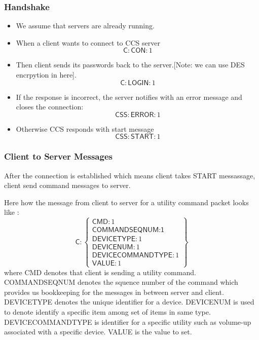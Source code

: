 \subsubsection{Handshake}
\label{sec:pdus:pdu:hs}
\begin{itemize}
\item We assume that servers are already running. 
\item When a client wants to connect to \textsf{CCS} server
  \[ \textsf{C} : \textsf{CON} : 1\]
\item Then client sends its passwords back to the server.[Note: we can use DES encrpytion in here]. 
  \[\textsf{C} : \textsf{LOGIN} : 1\]
\item If the response is incorrect, the server notifies with an error message and closes the connection:
  \[\textsf{CSS}:\textsf{ERROR}:1\]
\item Otherwise \textsf{CCS} responds with start message
  \[\textsf{CSS} : \textsf{START} : 1\]
\end{itemize}

\subsubsection{Client to Server Messages}
\label{sec:pdus:pdu:c_to_s}

After the connection is established which means client takes \textsf{START} messassage, client send command messages to server. 

Here how the message from client to server for a utility command packet looks like :
\[
\textsf{C}:\left\{ \begin{array}{ll}  \textsf{CMD}:1\\
                                      \textsf{COMMANDSEQNUM:1}\\
                                      \textsf{DEVICETYPE}:1 \\
                                       \textsf{DEVICENUM}:1 \\
                                      \textsf{DEVICECOMMANDTYPE}:1 \\
                                        \textsf{VALUE}:1

           \end{array} \right\}
\]                                        
where \textsf{CMD} denotes that client is sending a utility command. \textsf{COMMANDSEQNUM} denotes the squence number of the command which provides us bookkeeping for the messages in between server and client. \textsf{DEVICETYPE} denotes the unique identifier for a device. \textsf{DEVICENUM} is used to denote identify a specific item among set of items in same type. \textsf{DEVICECOMMANDTYPE} is identifier for a specific utility such as volume-up associated with a specific device. \textsf{VALUE} is the value to set.


